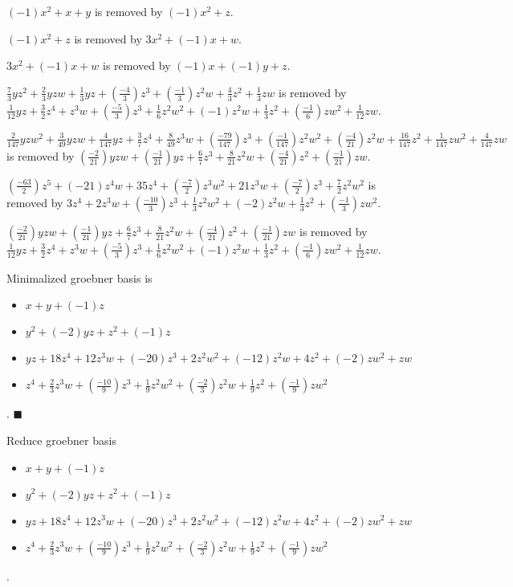 $(-1)x^{2}+x+y$ is removed by $(-1)x^{2}+z$.

$(-1)x^{2}+z$ is removed by $3x^{2}+(-1)x+w$.

$3x^{2}+(-1)x+w$ is removed by $(-1)x+(-1)y+z$.

$\frac{7}{3}yz^{2}+\frac{2}{3}yzw+\frac{1}{3}yz+(\frac{-4}{3})z^{3}+(\frac{-1}{3})z^{2}w+\frac{4}{3}z^{2}+\frac{1}{3}zw$ is removed by $\frac{1}{12}yz+\frac{3}{2}z^{4}+z^{3}w+(\frac{-5}{3})z^{3}+\frac{1}{6}z^{2}w^{2}+(-1)z^{2}w+\frac{1}{3}z^{2}+(\frac{-1}{6})zw^{2}+\frac{1}{12}zw$.

$\frac{2}{147}yzw^{2}+\frac{3}{49}yzw+\frac{4}{147}yz+\frac{3}{7}z^{4}+\frac{8}{49}z^{3}w+(\frac{-79}{147})z^{3}+(\frac{-1}{147})z^{2}w^{2}+(\frac{-4}{21})z^{2}w+\frac{16}{147}z^{2}+\frac{1}{147}zw^{2}+\frac{4}{147}zw$ is removed by $(\frac{-2}{21})yzw+(\frac{-1}{21})yz+\frac{6}{7}z^{3}+\frac{8}{21}z^{2}w+(\frac{-4}{21})z^{2}+(\frac{-1}{21})zw$.

$(\frac{-63}{2})z^{5}+(-21)z^{4}w+35z^{4}+(\frac{-7}{2})z^{3}w^{2}+21z^{3}w+(\frac{-7}{2})z^{3}+\frac{7}{2}z^{2}w^{2}$ is removed by $3z^{4}+2z^{3}w+(\frac{-10}{3})z^{3}+\frac{1}{3}z^{2}w^{2}+(-2)z^{2}w+\frac{1}{3}z^{2}+(\frac{-1}{3})zw^{2}$.

$(\frac{-2}{21})yzw+(\frac{-1}{21})yz+\frac{6}{7}z^{3}+\frac{8}{21}z^{2}w+(\frac{-4}{21})z^{2}+(\frac{-1}{21})zw$ is removed by $\frac{1}{12}yz+\frac{3}{2}z^{4}+z^{3}w+(\frac{-5}{3})z^{3}+\frac{1}{6}z^{2}w^{2}+(-1)z^{2}w+\frac{1}{3}z^{2}+(\frac{-1}{6})zw^{2}+\frac{1}{12}zw$.

Minimalized groebner basis is
\begin{itemize}
\item $x+y+(-1)z$
\item $y^{2}+(-2)yz+z^{2}+(-1)z$
\item $yz+18z^{4}+12z^{3}w+(-20)z^{3}+2z^{2}w^{2}+(-12)z^{2}w+4z^{2}+(-2)zw^{2}+zw$
\item $z^{4}+\frac{2}{3}z^{3}w+(\frac{-10}{9})z^{3}+\frac{1}{9}z^{2}w^{2}+(\frac{-2}{3})z^{2}w+\frac{1}{9}z^{2}+(\frac{-1}{9})zw^{2}$
\end{itemize}  .
$\blacksquare{}$

Reduce groebner basis
\begin{itemize}
\item $x+y+(-1)z$
\item $y^{2}+(-2)yz+z^{2}+(-1)z$
\item $yz+18z^{4}+12z^{3}w+(-20)z^{3}+2z^{2}w^{2}+(-12)z^{2}w+4z^{2}+(-2)zw^{2}+zw$
\item $z^{4}+\frac{2}{3}z^{3}w+(\frac{-10}{9})z^{3}+\frac{1}{9}z^{2}w^{2}+(\frac{-2}{3})z^{2}w+\frac{1}{9}z^{2}+(\frac{-1}{9})zw^{2}$
\end{itemize}  .


